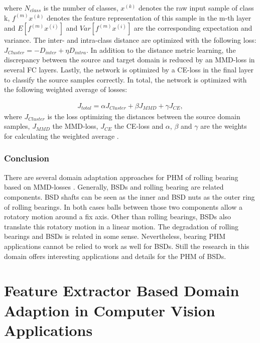 where $N_{class}$ is the number of classes, $x^{(k)}$ denotes the raw input sample of class k, $f^{(m)}x^{(k)}$ denotes the feature representation of this sample in the m-th layer and $E[f^{(m)}x^{(i)}]$ and $Var[f^{(m)}x^{(i)}]$ are the corresponding expectation and variance. The inter- and intra-class distance are optimized with the following loss: $J_{Cluster} = - D_{inter} + \eta D_{intra}$. In addition to the distance metric learning, the discrepancy between the source and target domain is reduced by an MMD-loss in several FC layers. Lastly, the network is optimized by a CE-loss in the final layer to classify the source samples correctly. In total, the network is optimized with the following weighted average of losses: 

\begin{equation}
    \begin{aligned}
    J_{total} = \alpha J_{Cluster} + \beta J_{MMD} + \gamma J_{CE}, 
    \end{aligned}
\end{equation}
where $J_{Cluster}$ is the loss optimizing the distances between the source domain samples, $J_{MMD}$ the MMD-loss,  $J_{CE}$ the CE-loss and $\alpha$, $\beta$ and $\gamma$ are the weights for calculating the weighted average \cite{Li2018}.

\subsubsection{Conclusion}
There are several domain adaptation approaches for PHM of rolling bearing based on MMD-losses \cite{AN201942} \cite{Li2018} \cite{Guo2019} \cite{Singh2019} \cite{Kang2020}. Generally, BSDs and rolling bearing are related components. BSD shafts can be seen as the inner and BSD nuts as the outer ring of rolling bearings. In both cases balls between those two components allow a rotatory motion around a fix axis. Other than rolling bearings, BSDs also translate this rotatory motion in a linear motion. The degradation of rolling bearings and BSDs is related in some sense. Nevertheless, bearing PHM applications cannot be relied to work as well for BSDs. Still the research in this domain offers interesting applications and details for the PHM of BSDs. 

\section{Feature Extractor Based Domain Adaption in Computer Vision Applications}

